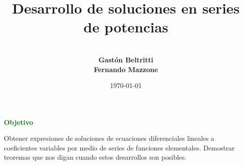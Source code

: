 \documentclass{beamer}
\title[Series de potencias]{Desarrollo de soluciones en series de potencias}
\author[]{\vspace{.5cm} \\ \textbf{Gastón Beltritti} \\ \vspace{.1cm} \textbf{Fernando Mazzone}}
\institute{Departamento de Matemática \\FCEFQyN - UNRC.}
\date{\today}
\renewcommand{\textbf}[1]{\textcolor{green}{\bfseries #1}}
\begin{document}
\frame{\titlepage} %




 



\begin{frame}{\textbf{Objetivo}}
 
\begin{block}{}
Obtener expresiones de soluciones de ecuaciones diferenciales lineales a coeficientes variables por medio de series de funciones elementales. Demostrar teoremas que nos digan cuando estos desarrollos son posibles.
\end{block}
\end{frame}






 
\end{document}
